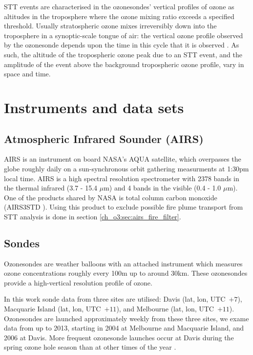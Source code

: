     STT events are characterised in the ozonesondes' vertical profiles of ozone as altitudes in the troposphere where the ozone mixing ratio exceeds a specified threshold. 
    Usually stratospheric ozone mixes irreversibly down into the troposphere in a synoptic-scale tongue of air: the vertical ozone profile observed by the ozonesonde depends upon the time in this cycle that it is observed \citep{Sprenger2003}. 
    As such, the altitude of the tropospheric ozone peak due to an STT event, and the amplitude of the event above the background tropospheric ozone profile, vary in space and time.


\section{Instruments and data sets}
  \subsection{Atmospheric Infrared Sounder (AIRS)}
    AIRS is an instrument on board NASA's AQUA satellite, which overpasses the globe roughly daily on a sun-synchronous orbit gathering measurments at 1:30pm local time.
    AIRS is a high spectral resolution spectrometer with 2378 bands in the thermal infrared (3.7 - 15.4 $\mu$m) and 4 bands in the visible (0.4 - 1.0 $\mu$m).
    One of the products shared by NASA is total column carbon monoxide (AIRS3STD \citep{AIRS3STD}).
    Using this product to exclude possible fire plume transport from STT analysis is done in section \ref{ch_o3:sec:airs_fire_filter}.
  
  \subsection{Sondes}
  
    Ozonesondes are weather balloons with an attached instrument which measures ozone concentrations roughly every 100m up to around 30km. These ozonesondes provide a high-vertical resolution profile of ozone.
    
    In this work sonde data from three sites are utilised: Davis (lat, lon, UTC~$+7$), Macquarie Island (lat, lon, UTC~$+11$), and Melbourne (lat, lon, UTC~$+11$).
    Ozonesondes are launched approximately weekly from these three sites, we exame data from up to 2013, starting in 2004 at Melbourne and Macquarie Island, and 2006 at Davis.
    More frequent ozonesonde launches occur at Davis during the spring ozone hole season than at other times of the year \citep{Alexander2013}.
  

